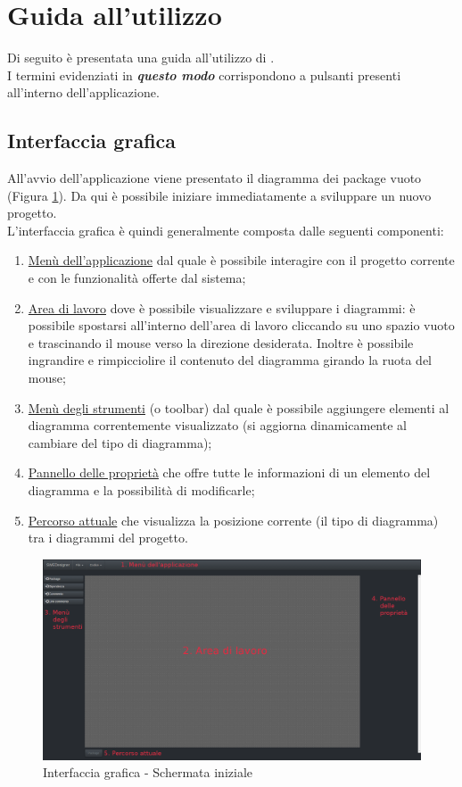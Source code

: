 \documentclass[../ManualeUtente.tex]{subfiles}
\begin{document}
	\section{Guida all'utilizzo}
		Di seguito è presentata una guida all'utilizzo di \progetto.\\
		I termini evidenziati in \textit{\textbf{questo modo}} corrispondono a pulsanti presenti all'interno
		dell'applicazione.
		\subsection{Interfaccia grafica}
			All'avvio dell'applicazione viene presentato il diagramma dei package vuoto (Figura \ref{fig:StartScreen}). Da qui è possibile iniziare immediatamente a sviluppare un nuovo progetto.\\
			L'interfaccia grafica è quindi generalmente composta dalle seguenti componenti:
			\begin{enumerate}
				\item \underline{Menù dell'applicazione} dal quale è possibile interagire con il progetto corrente e con
				le funzionalità offerte dal sistema;
				\item \underline{Area di lavoro} dove è possibile visualizzare e sviluppare i diagrammi: è possibile
				spostarsi all'interno dell'area di lavoro cliccando su uno spazio vuoto e trascinando il mouse
				verso la direzione desiderata. Inoltre è possibile ingrandire e rimpicciolire il contenuto
				del diagramma girando la ruota del mouse;
				\item \underline{Menù degli strumenti} (o toolbar) dal quale è possibile aggiungere elementi al diagramma
				correntemente visualizzato (si aggiorna dinamicamente al cambiare del tipo di diagramma);
				\item \underline{Pannello delle proprietà} che offre tutte le informazioni di un elemento del diagramma
				e la possibilità di modificarle;
				\item \underline{Percorso attuale} che visualizza la posizione corrente (il tipo di diagramma) tra i
				diagrammi del progetto.
			\end{enumerate}
			\begin{figure} [h!]
				\centering
				\includegraphics[scale=0.24]{./Immagini/StartScreen.png}
				\caption{Interfaccia grafica - Schermata iniziale}\label{fig:StartScreen}
			\end{figure}
\end{document}
